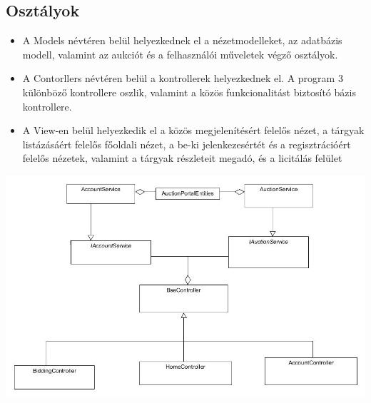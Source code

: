 \documentclass[12pt,a4paper]{article}
\begin{document}
\subsection{Osztályok}
\begin{itemize}
\item A Models névtéren belül helyezkednek el a nézetmodelleket, az adatbázis modell, valamint az aukciót és a felhasználói műveletek végző osztályok.
\item A Contorllers névtéren belül a kontrollerek helyezkednek el. A program 3 különböző kontrollere oszlik, valamint a közös funkcionalitást biztosító bázis kontrollere.
\item A View-en belül helyezkedik el a közös megjelenítésért felelős nézet, a tárgyak listázásáért felelős főoldali nézet,  a be-ki jelenkezesértét és a regisztrációért felelős nézetek, valamint a tárgyak részleteit megadó, és a licitálás felület
\end{itemize}
\includegraphics[scale=0.5]{osztaly_szerkezet.jpg}
\end{document}
